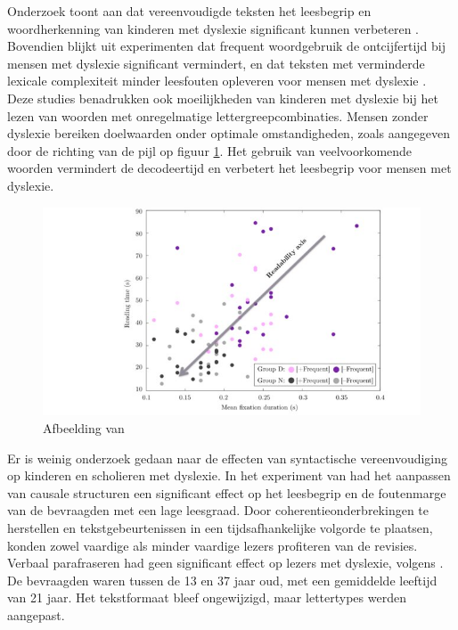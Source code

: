 Onderzoek toont aan dat vereenvoudigde teksten het leesbegrip en woordherkenning van kinderen met dyslexie significant kunnen verbeteren \autocite{RiveroContreras2021}. Bovendien blijkt uit experimenten dat frequent woordgebruik de ontcijfertijd bij mensen met dyslexie significant vermindert, en dat teksten met verminderde lexicale complexiteit minder leesfouten opleveren voor mensen met dyslexie \autocite{Rello2013a, Gala2016}. Deze studies benadrukken ook moeilijkheden van kinderen met dyslexie bij het lezen van woorden met onregelmatige lettergreepcombinaties. Mensen zonder dyslexie bereiken doelwaarden onder optimale omstandigheden, zoals aangegeven door de richting van de pijl op figuur \ref{img:readability-mean-fixation-duration}. Het gebruik van veelvoorkomende woorden vermindert de decodeertijd en verbetert het leesbegrip voor mensen met dyslexie.

\medspace

\begin{figure}
\includegraphics[width=\linewidth]{img/readability-mean-fixation-duration.png}
\caption{Afbeelding van \textcite{Rello2013a}}
\label{img:readability-mean-fixation-duration}
\end{figure}

\medspace

Er is weinig onderzoek gedaan naar de effecten van syntactische vereenvoudiging op kinderen en scholieren met dyslexie. In het experiment van \textcite{Linderholm2000} had het aanpassen van causale structuren een significant effect op het leesbegrip en de foutenmarge van de bevraagden met een lage leesgraad. Door coherentieonderbrekingen te herstellen en tekstgebeurtenissen in een tijdsafhankelijke volgorde te plaatsen, konden zowel vaardige als minder vaardige lezers profiteren van de revisies. Verbaal parafraseren had geen significant effect op lezers met dyslexie, volgens \textcite{Rello2013c}. De bevraagden waren tussen de 13 en 37 jaar oud, met een gemiddelde leeftijd van 21 jaar. Het tekstformaat bleef ongewijzigd, maar lettertypes werden aangepast.

